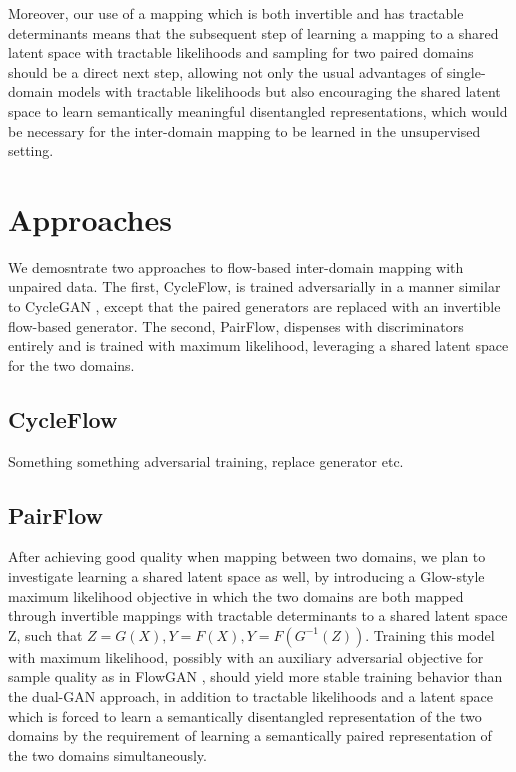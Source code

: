 \documentclass{article}
\begin{document}
Moreover, our use of a mapping which is both invertible and has tractable determinants means that the subsequent step of learning a mapping to a shared latent space with tractable likelihoods and sampling for two paired domains should be a direct next step, allowing not only the usual advantages of single-domain models with tractable likelihoods but also encouraging the shared latent space to learn semantically meaningful disentangled representations, which would be necessary for the inter-domain mapping to be learned in the unsupervised setting.


\section{Approaches}

We demosntrate two approaches to flow-based inter-domain mapping with unpaired data. The first, CycleFlow, is trained adversarially in a manner similar to CycleGAN \citep{chu2017cyclegan}, except that the paired generators are replaced with an invertible flow-based generator. The second, PairFlow, dispenses with discriminators entirely and is trained with maximum likelihood, leveraging a shared latent space for the two domains.

\subsection{CycleFlow}
Something something adversarial training, replace generator etc.

\subsection{PairFlow}

After achieving good quality when mapping between two domains, we plan to investigate learning a shared latent space as well, by introducing a Glow-style maximum likelihood objective in which the two domains are both mapped through invertible mappings with tractable determinants to a shared latent space Z, such that $Z = G(X), Y = F(X), Y = F(G^{-1}(Z))$. Training this model with maximum likelihood, possibly with an auxiliary adversarial objective for sample quality as in FlowGAN \citep{grover2017flow}, should yield more stable training behavior than the dual-GAN approach, in addition to tractable likelihoods and a latent space which is forced to learn a semantically disentangled representation of the two domains by the requirement of learning a semantically paired representation of the two domains simultaneously.
\end{document}
